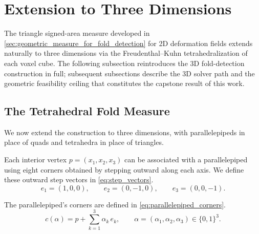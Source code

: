 \begin{table}[ht]\centering
\caption{TODO (deferred result): Central-difference blindness false-negative rates on real DVFs. Each row is a DVF source. Columns: total folded cells (triangulated measure), cells missed by central differences (\%), cells falsely flagged by central differences (\%).}
\label{tab:blindness}
\end{table}



\section{Extension to Three Dimensions}
\label{sec:3d_extension}

The triangle signed-area measure developed in \autoref{sec:geometric_measure_for_fold_detection} for 2D deformation fields extends naturally to three dimensions via the Freudenthal--Kuhn tetrahedralization of each voxel cube. The following subsection reintroduces the 3D fold-detection construction in full; subsequent subsections describe the 3D solver path and the geometric feasibility ceiling that constitutes the capstone result of this work.

\subsection{The Tetrahedral Fold Measure}
\label{sec:3d_fold_detection}

We now extend the construction to three dimensions, with parallelepipeds in place of quads and tetrahedra in place of triangles.

Each interior vertex $p = (x_1, x_2, x_3)$ can be associated with a parallelepiped using eight corners obtained by stepping outward along each axis. We define these outward step vectors in \autoref{eq:step_vectors}.
\begin{equation}
    \label{eq:step_vectors} e_1 = (1, 0, 0), \qquad e_2 = (0, -1, 0), \qquad e_3 = (0, 0, -1).
\end{equation}

The parallelepiped's corners are defined in \autoref{eq:parallelepiped_corners}.
\begin{equation}
    \label{eq:parallelepiped_corners} c(\alpha) = p + \sum_{k=1}^{3} \alpha_k\, e_k, \qquad \alpha = (\alpha_1, \alpha_2, \alpha_3) \in \{0, 1\}^3.
\end{equation}

